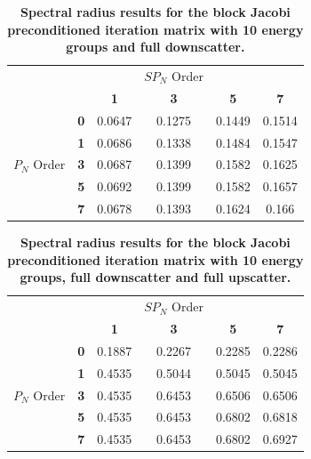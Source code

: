 \begin{table}[h!]
  \begin{center}
    \begin{tabular}{cccccc}\hline\hline
      \multicolumn{1}{c}{}& 
      \multicolumn{1}{c}{}& 
      \multicolumn{1}{c}{}& 
      \multicolumn{1}{c}{$SP_N$ Order}& 
      \multicolumn{1}{c}{}& 
      \multicolumn{1}{c}{} \\
       &   & \textbf{1} & \textbf{3} & \textbf{5} & \textbf{7}  \\
       & \textbf{0} & 0.0647 & 0.1275 & 0.1449 & 0.1514 \\
       & \textbf{1} & 0.0686 & 0.1338 & 0.1484 & 0.1547 \\
      $P_N$ Order & \textbf{3} & 0.0687 & 0.1399 & 0.1582 & 0.1625 \\
       & \textbf{5} & 0.0692 & 0.1399 & 0.1582 & 0.1657 \\
       & \textbf{7} & 0.0678 & 0.1393 & 0.1624 & 0.166 \\
      \hline\hline
    \end{tabular}
  \end{center}
  \caption{\textbf{Spectral radius results for the block Jacobi
      preconditioned iteration matrix with 10 energy groups and full
      downscatter.}}
  \label{tab:group10dsbj}
\end{table}
\begin{table}[h!]
  \begin{center}
    \begin{tabular}{cccccc}\hline\hline
      \multicolumn{1}{c}{}& 
      \multicolumn{1}{c}{}& 
      \multicolumn{1}{c}{}& 
      \multicolumn{1}{c}{$SP_N$ Order}& 
      \multicolumn{1}{c}{}& 
      \multicolumn{1}{c}{} \\
       &   & \textbf{1} & \textbf{3} & \textbf{5} & \textbf{7}  \\
       & \textbf{0} & 0.1887 & 0.2267 & 0.2285 & 0.2286 \\
       & \textbf{1} & 0.4535 & 0.5044 & 0.5045 & 0.5045 \\
      $P_N$ Order & \textbf{3} & 0.4535 & 0.6453 & 0.6506 & 0.6506 \\
       & \textbf{5} & 0.4535 & 0.6453 & 0.6802 & 0.6818 \\
       & \textbf{7} & 0.4535 & 0.6453 & 0.6802 & 0.6927 \\
      \hline\hline
    \end{tabular}
  \end{center}
  \caption{\textbf{Spectral radius results for the block Jacobi
      preconditioned iteration matrix with 10 energy groups, full
      downscatter and full upscatter.}}
  \label{tab:group10usbj}
\end{table}


